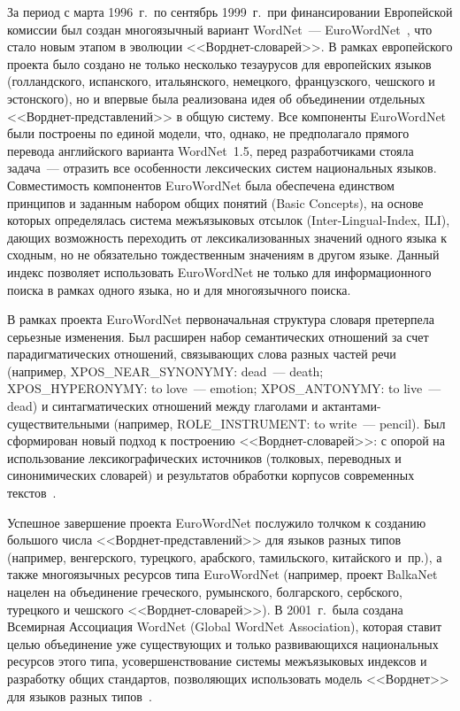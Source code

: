 \begin{multicols}{2}
     За период с марта 1996~г.\ по сентябрь 1999~г.\ при финансировании 
Европейской комиссии был создан многоязычный вариант WordNet~--- 
EuroWordNet~\cite{4koz}, что стало новым этапом в эволюции 
     <<Ворд\-нет-сло\-ва\-рей>>. В рамках европейского проекта \mbox{было} создано не 
только несколько тезаурусов для европейских языков (голландского, 
испанского, итальянского, немецкого, французского, %
 чешского и эстонского), 
но и впервые была реализована идея об объединении отдельных 
     <<Ворд\-нет-пред\-став\-ле\-ний>> в общую систему. Все компоненты 
EuroWordNet были построены по единой модели, что, однако, не предполагало 
прямого перевода английского варианта WordNet~1.5, перед разработчиками 
стояла задача~--- отразить все особенности лексических систем национальных 
языков. Со\-вмес\-ти\-мость компонентов EuroWordNet была обеспечена единством 
принципов и заданным набором общих понятий (Basic Concepts), на основе 
которых определялась система межъязыковых отсылок (Inter-Lingual-Index, ILI), 
дающих возможность переходить от лексикализованных значений одного 
языка к сходным, но не обязательно тождественным значениям в другом языке. 
Данный индекс позволяет использовать EuroWordNet не только для 
информационного поиска в рамках одного языка, но и для многоязычного 
поиска.
     
     В рамках проекта EuroWordNet первоначальная структура словаря 
претерпела серьезные изменения. Был расширен набор семантических 
отношений за счет парадигматических отношений, связывающих слова разных 
час\-тей речи (например, XPOS\_NEAR\_SYNONYMY: dead~--- death; 
XPOS\_HYPERONYMY: to love~--- emotion; XPOS\_ANTONYMY: to live~--- 
dead) и синтагматических отношений между глаголами и 
     ак\-тан\-та\-ми-су\-ще\-ст\-ви\-тель\-ны\-ми (например, ROLE\_INSTRUMENT: to 
write~--- pencil). Был сформирован новый подход к построению 
     <<Ворд\-нет-сло\-ва\-рей>>: с опорой на использование лек\-си\-ко\-гра\-фи\-че\-ских 
источников (толковых, переводных и синонимических словарей) и результатов 
обработки корпусов современных текстов~\cite{3koz}. 
     
     Успешное завершение проекта EuroWordNet послужило толчком к 
созданию большого числа <<Ворд\-нет-пред\-став\-ле\-ний>> для языков разных 
типов (например, венгерского, турецкого, арабского, тамильского, китайского 
и~пр.), а также многоязычных ресурсов типа EuroWordNet (например, проект 
BalkaNet нацелен на объединение греческого, румынского, болгарского, 
сербского, турецкого и чешского <<Ворд\-нет-сло\-ва\-рей>>). В 2001~г.\ была 
создана Всемирная Ассоциация WordNet (Global WordNet Association), которая 
ставит целью объединение уже существующих и только раз\-ви\-ва\-ющих\-ся 
национальных ресурсов этого типа, усовершенствование системы 
межъязыковых индексов и %
разработку общих стандартов, позволяющих 
использовать модель <<Ворднет>> для языков разных типов~\cite{5koz}.
{

}
\end{multicols}
